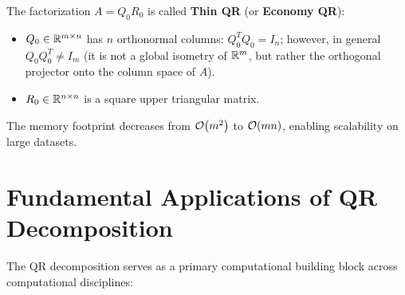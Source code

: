 \begin{definition}
\label{def:thin-qr-en}
The factorization $A = Q_0 R_0$ is called \textbf{Thin QR} (or \textbf{Economy QR}):
\begin{itemize}
    \item $Q_0 \in \mathbb{R}^{m \times n}$ has $n$ orthonormal columns: $Q_0^T Q_0 = I_n$; however, in general $Q_0 Q_0^T \neq I_m$ (it is not a global isometry of $\mathbb{R}^m$, but rather the orthogonal projector onto the column space of $A$).
    \item $R_0 \in \mathbb{R}^{n \times n}$ is a square upper triangular matrix.
\end{itemize}
The memory footprint decreases from $\mathcal{O}\!\left(m^2\right)$ to $\mathcal{O}\!\left(mn\right)$, enabling scalability on large datasets.
\end{definition}

\FloatBarrier
\section{Fundamental Applications of QR Decomposition}
\label{sec:applications-qr-en}

The QR decomposition serves as a primary computational building block across computational disciplines:

